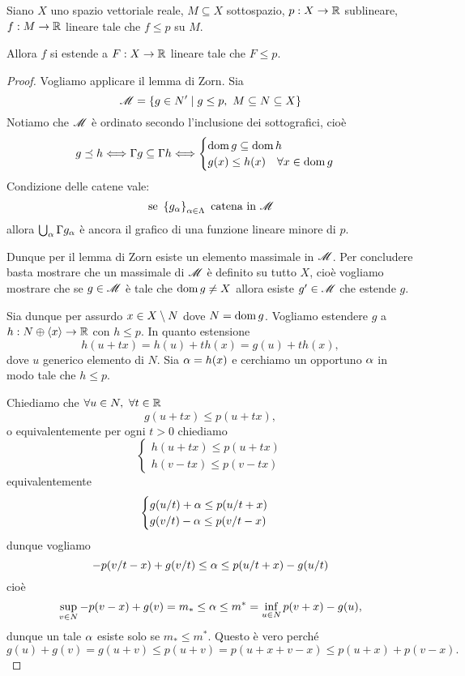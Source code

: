 \begin{theorem}\label{ThHahnBanach}
Siano $X$ uno spazio vettoriale reale, $M\subseteq X$ sottospazio, $p:X\to \mathbb{R}$ sublineare, $f:M\to \mathbb{R}$ lineare tale che $f\leq p$ su $M$.

Allora $f$ si estende a $F:X\to \mathbb{R}$ lineare tale che $F\leq p$.
\end{theorem}
\begin{proof}
Vogliamo applicare il lemma di Zorn. Sia
\[\mathscr{M}=\left\{{g\in N'\mid g\leq p,\ M\subseteq N\subseteq X}\right\}\]
Notiamo che $\mathscr{M}$ \`e ordinato secondo l'inclusione dei sottografici, cio\`e
\[g\preceq h\Longleftrightarrow \Gamma g\subseteq \Gamma h\Longleftrightarrow \begin{cases}
\operatorname{dom} g\subseteq \operatorname{dom} h\\
g(x)\leq h(x)\quad\forall x\in \operatorname{dom} g
\end{cases}\]
Condizione delle catene vale:
\[\text{se }\left\{{g_\alpha}\right\}_{\alpha\in \Lambda}\text{ catena in }\mathscr{M}\]
allora $\bigcup_\alpha\Gamma g_\alpha$ \`e ancora il grafico di una funzione lineare minore di $p$.

Dunque per il lemma di Zorn esiste un elemento massimale in $\mathscr{M}$. Per concludere basta mostrare che un massimale di $\mathscr{M}$ \`e definito su tutto $X$, cio\`e vogliamo mostrare che se $g\in \mathscr{M}$ \`e tale che $\operatorname{dom} g\neq X$ allora esiste $g'\in\mathscr{M}$ che estende $g$.

Sia dunque per assurdo $x\in X\setminus N$ dove $N=\operatorname{dom} g$. Vogliamo estendere $g$ a $h:N\oplus \left\langle {x}\right\rangle\to \mathbb{R}$ con $h\leq p$. In quanto estensione \[h(u+tx)=h(u)+th(x)=g(u)+th(x),\] dove $u$ generico elemento di $N$. Sia $\alpha=h(x)$ e cerchiamo un opportuno $\alpha$ in modo tale che $h\leq p$.

Chiediamo che $\forall u\in N,\ \forall t\in \mathbb{R}$\[g(u+tx)\leq p(u+tx),\]
o equivalentemente per ogni $t>0$ chiediamo
\[\begin{cases}
    h(u+tx)\leq p(u+tx)\\
    h(v-tx)\leq p(v-tx)
\end{cases}\]
equivalentemente
\[\begin{cases}
    g(u/t)+\alpha\leq p(u/t+x)\\
    g(v/t)-\alpha\leq p(v/t-x)
\end{cases}\]
dunque vogliamo
\[-p(v/t-x)+g(v/t)\leq \alpha\leq p(u/t+x)-g(u/t)\]
cio\`e \[\sup_{v\in N}-p(v-x)+g(v)=m_\ast\leq \alpha\leq m^\ast=\inf_{u\in N}p(v+x)-g(u),\]
dunque un tale $\alpha$ esiste solo se $m_\ast\leq m^\ast$. Questo \`e vero perch\'e
\[g(u)+g(v)=g(u+v)\leq p(u+v)=p(u+x+v-x)\leq p(u+x)+p(v-x).\]
\end{proof}


